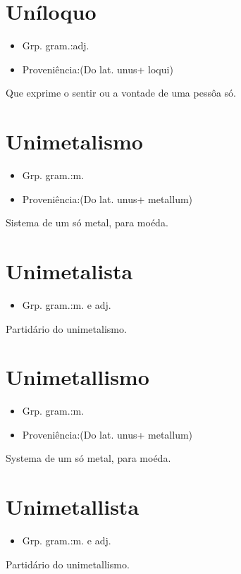 \documentclass{article}
\begin{document}
\section{Uníloquo}
\begin{itemize}
\item {Grp. gram.:adj.}
\end{itemize}
\begin{itemize}
\item {Proveniência:(Do lat. \textunderscore unus\textunderscore  + \textunderscore loqui\textunderscore )}
\end{itemize}
Que exprime o sentir ou a vontade de uma pessôa só.
\section{Unimetalismo}
\begin{itemize}
\item {Grp. gram.:m.}
\end{itemize}
\begin{itemize}
\item {Proveniência:(Do lat. \textunderscore unus\textunderscore  + \textunderscore metallum\textunderscore )}
\end{itemize}
Sistema de um só metal, para moéda.
\section{Unimetalista}
\begin{itemize}
\item {Grp. gram.:m.  e  adj.}
\end{itemize}
Partidário do unimetalismo.
\section{Unimetallismo}
\begin{itemize}
\item {Grp. gram.:m.}
\end{itemize}
\begin{itemize}
\item {Proveniência:(Do lat. \textunderscore unus\textunderscore  + \textunderscore metallum\textunderscore )}
\end{itemize}
Systema de um só metal, para moéda.
\section{Unimetallista}
\begin{itemize}
\item {Grp. gram.:m.  e  adj.}
\end{itemize}
Partidário do unimetallismo.
\end{document}
